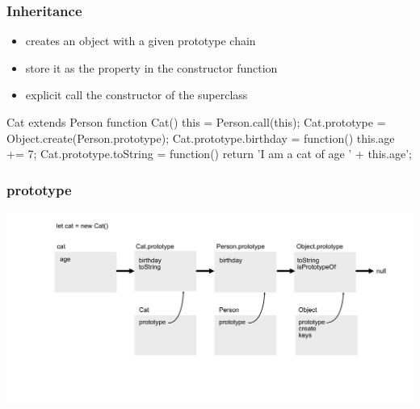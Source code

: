 \begin{frame}[fragile] \frametitle{Inheritance}
\begin{itemize}
  \item {} creates an object with a given prototype chain
  \item store it as the  property in the constructor function
  \item explicit call the constructor of the superclass
\end{itemize}
\vspace{2mm}
\begin{CodeBox}{Cat extends Person}
function Cat() {
  this = Person.call(this);
}
Cat.prototype = Object.create(Person.prototype);
Cat.prototype.birthday = function() { this.age += 7; }
Cat.prototype.toString = function() {
  return 'I am a cat of age ' + this.age';
}
\end{CodeBox}
\end{frame}

\begin{frame}[fragile] \frametitle{prototype}
  \centering
  \includegraphics[width=14cm]{img/prototype_chain5}
\end{frame}

